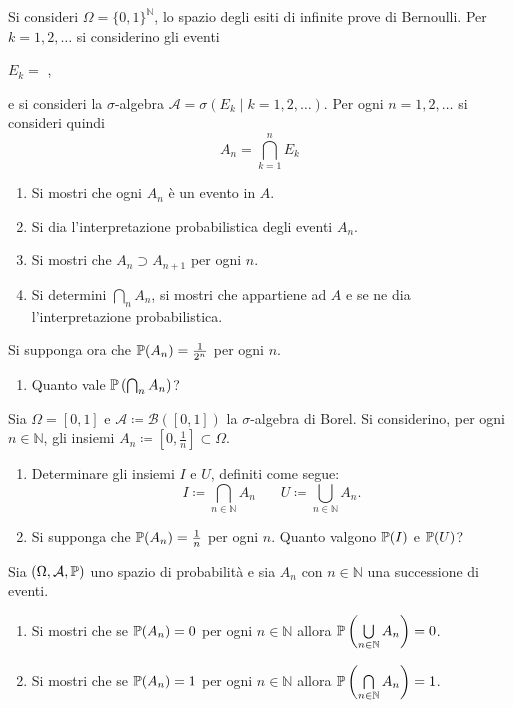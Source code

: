 \Esercizio{}

Si consideri $\Omega =\{0,1\}^{\mathbb{N}}$, lo spazio degli esiti di infinite prove di Bernoulli. Per $k=1,2,\dots $ si considerino gli eventi
\begin{center}
	$E_{k} =$ ,
\end{center}
e si consideri la $\sigma $-algebra $\mathcal{A} =\sigma (E_{k} \mid k=1,2,\dots)$. Per ogni $n=1,2,\dots $ si consideri quindi
\begin{equation*}
	A_{n} =\bigcap _{k=1}^{n} E_{k}
\end{equation*}
\begin{enumerate}
	\item Si mostri che ogni $A_{n}$ è un evento in $A$.
	\item Si dia l'interpretazione probabilistica degli eventi $A_{n}$.
	\item Si mostri che $A_{n} \supset A_{n+1}$ per ogni $n$.
	\item Si determini $\bigcap _{n} A_{n}$, si mostri che appartiene ad $A$ e se ne dia l'interpretazione probabilistica.
\end{enumerate}
Si supponga ora che $\mathbb{P}(A_{n}) =\frac{1}{2^{n}}$ per ogni $n$.
\begin{enumerate}[resume]
	\item Quanto vale $\mathbb{P}\left(\bigcap_{n} A_{n}\right)$?
\end{enumerate}

\Esercizio{}

Sia $\Omega =[0,1]$ e $\mathcal{A} \coloneqq \mathcal{B}([0,1])$ la $\sigma $-algebra di Borel. Si considerino, per ogni $n\in \mathbb{N}$, gli insiemi $A_{n} \coloneqq \left[0,\frac{1}{n}\right] \subset \Omega $.
\begin{enumerate}
	\item Determinare gli insiemi $I$ e $U$, definiti come segue:
	\begin{equation*}
		I\coloneqq \bigcap _{n\in \mathbb{N}} A_{n} \ \ \ \ \ \ \ \ U\coloneqq \bigcup _{n\in \mathbb{N}} A_{n} .
	\end{equation*}
	\item Si supponga che $\mathbb{P}(A_{n}) =\frac{1}{n}$ per ogni $n$. Quanto valgono $\mathbb{P}(I)$ e $\mathbb{P}(U)$?
\end{enumerate}

\Esercizio{$\star$}

Sia $(\Omega ,\mathcal{A} ,\mathbb{P})$ uno spazio di probabilità e sia $A_{n}$ con $n\in \mathbb{N}$ una successione di eventi.
\begin{enumerate}
	\item Si mostri che se $\mathbb{P}(A_{n}) =0$ per ogni $n\in \mathbb{N}$ allora $\mathbb{P}\left(\bigcup\limits _{n\in \mathbb{N}} A_{n}\right) =0$.
	\item Si mostri che se $\mathbb{P}(A_{n}) =1$ per ogni $n\in \mathbb{N}$ allora $\mathbb{P}\left(\bigcap\limits _{n\in \mathbb{N}} A_{n}\right) =1$.
\end{enumerate}

